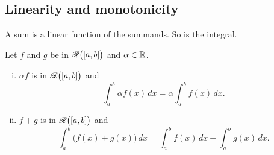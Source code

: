 \subsection{Linearity and monotonicity}

A sum is a linear function of the summands.  So is the integral.

\begin{prop}[Linearity]
\label{prop:integrallinear}
Let $f$ and $g$ be in ${\mathscr{R}}\bigl([a,b]\bigr)$ and $\alpha \in {\mathbb{R}}$.
\begin{enumerate}[(i)]
\item $\alpha f$ is in ${\mathscr{R}}\bigl([a,b]\bigr)$ and
\begin{equation*}
\int_a^b \alpha f(x) \,dx = \alpha \int_a^b f(x) \,dx .
\end{equation*}
\item $f+g$ is in ${\mathscr{R}}\bigl([a,b]\bigr)$ and
\begin{equation*}
\int_a^b \bigl( f(x)+g(x) \bigr) \,dx = 
\int_a^b f(x) \,dx 
+
\int_a^b g(x) \,dx .
\end{equation*}
\end{enumerate}
\end{prop}

